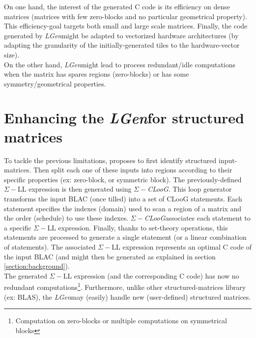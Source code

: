 \documentclass[11pt]{article}											%
\newcommand{\targetname}			{\emph{LGen}}
\newcommand{\targetnameStatement}	{\emph{$\Sigma-$CLooG}}
\begin{document}
	On one hand, the interest of the generated C code is its efficiency on dense matrices (matrices with few zero-blocks and no particular geometrical property).   This efficiency-goal targets both small and large scale matrices.   Finally, the code generated by \targetname\space might be adapted to vectorized hardware architectures (by adapting the granularity of the initially-generated tiles to the hardware-vector size).\\
	On the other hand, \targetname\space might lead to process redundant/idle computations when the matrix has spares regions (zero-blocks) or has some symmetry/geometrical properties.


\section{Enhancing the \targetname\space for structured matrices}
	To tackle the previous limitations, \cite{mainPaper} proposes to first identify structured input-matrices.   Then split each one of these inputs into regions according to their specific properties (ex: zero-block, or symmetric block).
	The previously-defined $\Sigma-$LL expression is then generated using \targetnameStatement.   This loop generator transforms the input BLAC (once tilled) into a set of CLooG statements.   Each statement specifies the indexes (domain) used to scan a region of a matrix and the order (schedule) to use these indexes.    \targetnameStatement\space associates each statement to a specific $\Sigma-$LL expression.   Finally, thanks to set-theory operations, this statements are processed to generate a single statement (or a linear combination of statements).   The associated $\Sigma-$LL expression represents an optimal C code of the input BLAC (and might then be generated as explained in section \ref{section:background}).\\

	The generated $\Sigma-$LL expression (and the corresponding C code) has now no redundant computations\footnote{Computation on zero-blocks or multiple computations on symmetrical blocks}.   Furthermore, unlike other structured-matrices library (ex: BLAS), the \targetname\space may (easily) handle new (user-defined) structured matrices.
\end{document}
